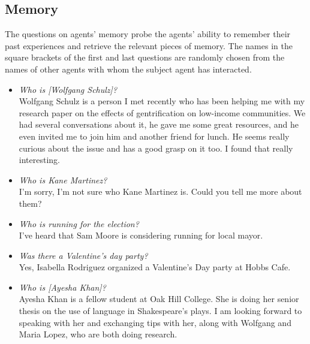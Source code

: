 \subsection{Memory}
The questions on agents' memory probe the agents' ability to remember their past experiences and retrieve the relevant pieces of memory. The names in the square brackets of the first and last questions are randomly chosen from the names of other agents with whom the subject agent has interacted.
\begin{itemize}
\item \textit{Who is [Wolfgang Schulz]?}\\
Wolfgang Schulz is a person I met recently who has been helping me with my research paper on the effects of gentrification on low-income communities. We had several conversations about it, he gave me some great resources, and he even invited me to join him and another friend for lunch. He seems really curious about the issue and has a good grasp on it too. I found that really interesting.
\item \textit{Who is Kane Martinez?}\\
I'm sorry, I'm not sure who Kane Martinez is. Could you tell me more about them?
\item \textit{Who is running for the election?}\\
I've heard that Sam Moore is considering running for local mayor.
\item \textit{Was there a Valentine’s day party?}\\
Yes, Isabella Rodriguez organized a Valentine's Day party at Hobbs Cafe.
\item \textit{Who is [Ayesha Khan]?}\\
Ayesha Khan is a fellow student at Oak Hill College. She is  doing her senior thesis on the use of language in Shakespeare's plays. I am looking forward to speaking with her and exchanging tips with her, along with Wolfgang and Maria Lopez, who are both doing research.
\end{itemize}

